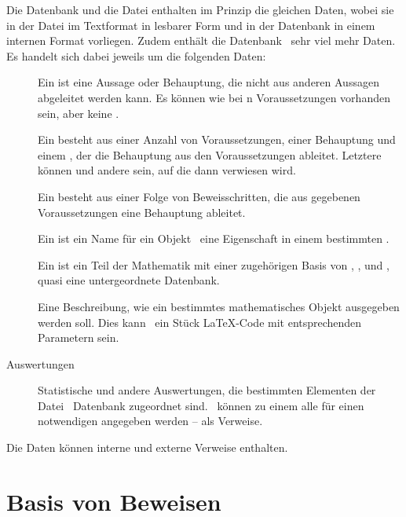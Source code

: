 Die Datenbank und die Datei enthalten im Prinzip die gleichen Daten, wobei sie in der Datei im Textformat in lesbarer Form und in der Datenbank in einem internen Format vorliegen.
Zudem enthält die Datenbank \textiAlg\ sehr viel mehr Daten. Es handelt sich dabei jeweils um die folgenden Daten:
\begin{description}
	\item[]         \label{Daten:Axiom}
	Ein  ist eine Aussage oder Behauptung, die nicht aus anderen Aussagen abgeleitet werden kann.
	Es können wie bei n Voraussetzungen vorhanden sein, aber keine .
	\item[]          \label{Daten:Satz}
	Ein  besteht aus einer Anzahl von Voraussetzungen, einer Behauptung und einem , der die Behauptung aus den Voraussetzungen ableitet.
	Letztere können  und andere  sein, auf die dann verwiesen wird.
	\item[]        \label{Daten:Beweis}
	Ein  besteht aus einer Folge von Beweisschritten, die aus gegebenen Voraussetzungen eine Behauptung ableitet.
	\item[]   \label{Daten:Fachbegriff}
	Ein  ist ein Name für ein Objekt \textbzw\ eine Eigenschaft in einem bestimmten .
	\item[]    \label{Daten:Fachgebiet}
	Ein  ist ein Teil der Mathematik mit einer zugehörigen Basis von , ,  und , quasi eine untergeordnete Datenbank.
	\item[] \label{Daten:Ausgabeschema}
	Eine Beschreibung, wie ein bestimmtes mathematisches Objekt ausgegeben werden soll.
	Dies kann \textzB\ ein Stück \LaTeX-Code mit entsprechenden Parametern sein.
	\item[Auswertungen]             \label{Daten:Auswertung}
	Statistische und andere Auswertungen, die bestimmten Elementen der Datei \textbzw\ Datenbank zugeordnet sind.
	\textZB\ können zu einem  alle für einen  notwendigen  angegeben werden -- als Verweise.
\end{description}
Die Daten können interne und externe Verweise enthalten.

\section{Basis von Beweisen}
\label{sec:BeweisBasis}

